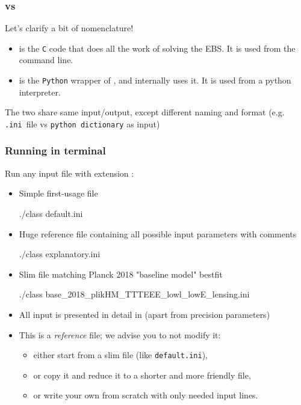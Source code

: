 \begin{frame}[fragile]
	\frametitle{\CLASS{} vs \classy{}}
	Let's clarify a bit of nomenclature!
	\begin{itemize}
		\item {\Red \CLASS{}} is the \texttt{C} code that does all the work of solving the EBS. It is used from the command line.
		\item {\Purple \classy{}} is the \texttt{Python} wrapper of {\Red \CLASS{}}, and internally uses it. It is used from a python interpreter.
	\end{itemize}
	The two share same input/output, except different naming and format
	(e.g. \mbox{\Red\texttt{.ini} file}  vs \texttt{\Purple python dictionary} as input)
\end{frame}

\begin{frame}[fragile]
\frametitle{Running \CLASS{} in terminal}

Run any input file with extension :
\hspace*{-2em}
\begin{itemize}
	\item Simple first-usage file \begin{class}
./class default.ini
	\end{class}
	\item Huge reference file containing all possible input parameters with comments
	\begin{class}
./class explanatory.ini
	\end{class}
	\item Slim file matching Planck 2018 "baseline model" bestfit \\ \begin{class}
./class base_2018_plikHM_TTTEEE_lowl_lowE_lensing.ini
	\end{class}
\end{itemize}
\pause
\begin{itemize}
	\item
	All input is presented in detail in  (apart from precision parameters)
	\item
	This is a \textit{reference} file; we advise you to not modify it: 
	\begin{itemize}
		\item {\scriptsize either start from a slim file (like {\tt default.ini}), }
		\item
		{\scriptsize or copy it and reduce it to a shorter and more friendly file, }
		\item {\scriptsize or write your own from scratch with only needed input lines.}
	\end{itemize}
\end{itemize}


\end{frame}



